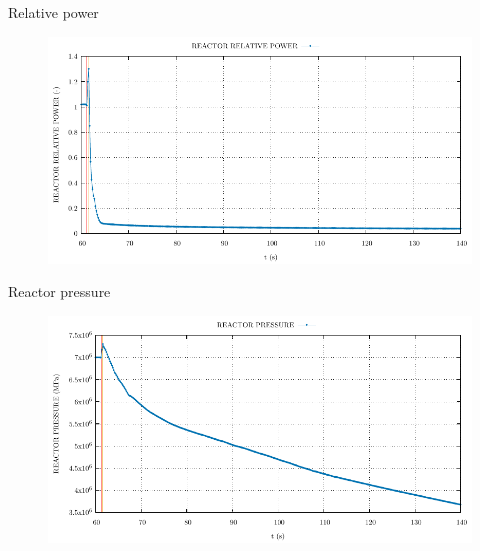 \begin{frame}{Relative power}
	\begin{figure}
		\centering
		\includegraphics[width=\textwidth]{./02SteamLineBreak/graphs/REACTOR RELATIVE POWER.pdf}
		
	\end{figure}
\end{frame}


\begin{frame}{Reactor pressure}
	\begin{figure}
		\centering
		\includegraphics[width=\textwidth]{./02SteamLineBreak/graphs/REACTOR PRESSURE.pdf}
		
	\end{figure}
	
\end{frame}


